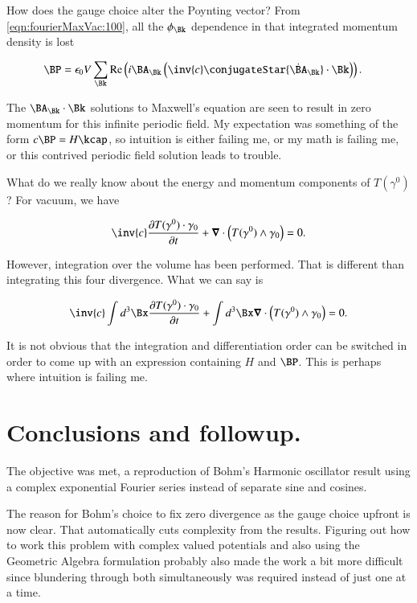 How does the gauge choice alter the Poynting vector?  From \autoref{eqn:fourierMaxVac:100}, all the $\phi_\Bk$ dependence in that integrated momentum density is lost

\begin{align}\label{eqn:fourierMaxVac:200}
\BP &= \epsilon_0 V \sum_{\Bk}
\Real \left(
i \BA_\Bk \left( \inv{c} \conjugateStar{\dot{\BA}_\Bk} \cdot \Bk \right)
\right).
\end{align}

The $\BA_\Bk \cdot \Bk$ solutions to Maxwell's equation are seen to result in zero momentum for this infinite periodic field.  My expectation was something of the form $c \BP = H \kcap$, so intuition is either failing me, or my math is failing me, or this contrived periodic field solution leads to trouble.

What do we really know about the energy and momentum components of $T(\gamma^0)$?  For vacuum, we have 

\begin{align}\label{eqn:fourierMaxVac:201}
\inv{c} \PD{t}{T(\gamma^0) \cdot \gamma_0} + \spacegrad \cdot \Bigl(T(\gamma^0) \wedge \gamma_0 \Bigr) = 0.
\end{align}

However, integration over the volume has been performed.  That is different than integrating this four divergence.  What we can say is

\begin{align}\label{eqn:fourierMaxVac:202}
\inv{c} \int d^3 \Bx \PD{t}{T(\gamma^0) \cdot \gamma_0} + \int d^3 \Bx \spacegrad \cdot \Bigl(T(\gamma^0) \wedge \gamma_0 \Bigr) = 0.
\end{align}

It is not obvious that the integration and differentiation order can be switched in order to come up with an expression containing $H$ and $\BP$.  This is perhaps where intuition is failing me.

\section{Conclusions and followup.}

The objective was met, a reproduction of Bohm's Harmonic oscillator result using a complex exponential Fourier series instead of separate sine and cosines.

The reason for Bohm's choice to fix zero divergence as the gauge choice upfront is now clear.  That automatically cuts complexity from the results.  Figuring out how to work this problem with complex valued potentials and also using the Geometric Algebra formulation probably also made the work a bit more difficult since blundering through both simultaneously was required instead of just one at a time.


